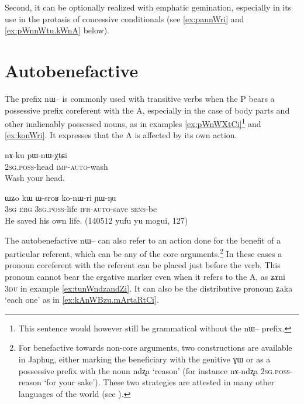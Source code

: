 \documentclass[oldfontcommands,oneside,a4paper,11pt]{article}
\newcommand{\ipa}[1]{{\phon \mbox{#1}}} %
\begin{document}
Second, it can be optionally realized with emphatic gemination, especially in its use in the protasis of concessive conditionals (see \ref{ex:pannWri} and \ref{ex:pWnnWtu.kWnA}  below).


\section{Autobenefactive}

The prefix \ipa{nɯ--}  is commonly used with transitive verbs when the P bears a possessive prefix coreferent with the A, especially in the case of body parts and other inalienably possessed nouns, as in examples \ref{ex:pWnWXtCi}\footnote{This sentence would however still be grammatical without the \ipa{nɯ--} prefix.} and \ref{ex:konWri}. It expresses that the A is affected by its own action.

\begin{exe}
\ex \label{ex:pWnWXtCi}
\gll 
\ipa{nɤ-ku} 	\ipa{pɯ-nɯ-χtɕi} \\
\textsc{2sg.poss}-head \textsc{imp-auto}-wash \\
\glt Wash your head.
\end{exe}

\begin{exe}
\ex \label{ex:konWri}
\gll 
\ipa{ɯʑo} 	\ipa{kɯ} 	\ipa{ɯ-sroʁ} 	\ipa{ko-nɯ-ri} 	\ipa{ɲɯ-ŋu} \\
\textsc{3sg} \textsc{erg} \textsc{3sg.poss}-life \textsc{ifr-auto}-save \textsc{sens}-be \\
\glt He saved his own life. (140512 yufu yu mogui, 127)
\end{exe}

The autobenefactive \ipa{nɯ--} can also refer to an action done for the benefit of a particular referent, which can be any of the core arguments.\footnote{For benefactive towards non-core arguments, two constructions are available in Japhug, either marking the beneficiary with the genitive \ipa{ɣɯ} or as a possessive prefix with the noun \ipa{ndʐa} `reason' (for instance \ipa{nɤ-ndʐa} \textsc{2sg.poss}-reason `for your sake'). These two strategies are attested in many other languages of the world (see \citealt[7-10]{zuniga10benefactive}).} In these cases a pronoun coreferent with the referent can be placed just before the verb. This pronoun cannot bear the ergative marker even when it refers to the A, as \ipa{ʑɤni} \textsc{3du} in example \ref{ex:tunWndzandZi}. It can also be the distributive pronoun \ipa{ʑaka} `each one' as in \ref{ex:kAnWBzu.mArtaRtCi}.
\end{document}
